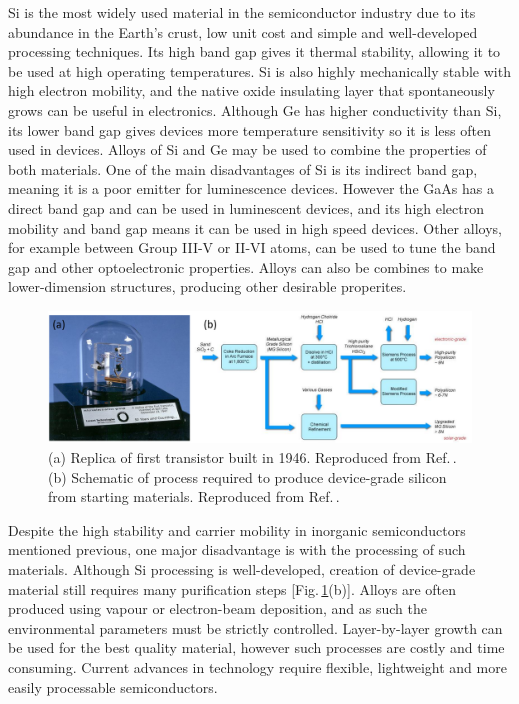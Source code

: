 Si is the most widely used material in the semiconductor industry due to its abundance in the Earth's crust, low unit cost and simple and well-developed processing techniques. Its high band gap gives it thermal stability, allowing it to be used at high operating temperatures. Si is also highly mechanically stable with high electron mobility, and the native oxide insulating layer that spontaneously grows can be useful in electronics. Although Ge has higher conductivity than Si, its lower band gap gives devices more temperature sensitivity so it is less often used in devices. Alloys of Si and Ge may be used to combine the properties of both materials. One of the main disadvantages of Si is its indirect band gap, meaning it is a poor emitter for luminescence devices. However the GaAs has a direct band gap and can be used in luminescent devices, and its high electron mobility and band gap means it can be used in high speed devices. Other alloys, for example between Group III-V or II-VI atoms, can be used to tune the band gap and other optoelectronic properties. Alloys can also be combines to make lower-dimension structures, producing other desirable properites.
\begin{figure}[ht]
\centering
\includegraphics[width=\textwidth]{Fig1}
\caption{(a) Replica of first transistor built in 1946. Reproduced from Ref.\,\cite{Transistor}. (b) Schematic of process required to produce device-grade silicon from starting materials. Reproduced from Ref.\,\cite{Silicon}.}
\label{1Fig1}
\end{figure}

Despite the high stability and carrier mobility in inorganic semiconductors mentioned previous, one major disadvantage is with the processing of such materials. Although Si processing is well-developed, creation of device-grade material still requires many purification steps [Fig.\,\ref{1Fig1}(b)]. Alloys are often produced using vapour or electron-beam deposition, and as such the environmental parameters must be strictly controlled. Layer-by-layer growth can be used for the best quality material, however such processes are costly and time consuming. Current advances in technology require flexible, lightweight and more easily processable semiconductors. 

